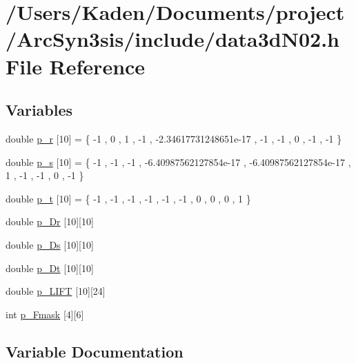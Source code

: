 \hypertarget{a00482}{}\section{/\+Users/\+Kaden/\+Documents/project/\+Arc\+Syn3sis/include/data3d\+N02.h File Reference}
\label{a00482}
\subsection*{Variables}
\begin{DoxyCompactItemize}
\item 
double \hyperlink{a00482_ad0e413c816dfa121d92ed67c43d35071}{p\+\_\+r} \mbox{[}10\mbox{]} = \{ -\/1 , 0 , 1 , -\/1 , -\/2.\+34617731248651e-\/17 , -\/1 , -\/1 , 0 , -\/1 , -\/1 \}
\item 
double \hyperlink{a00482_ab412f40aac46b2e78aceb916a6f1b16f}{p\+\_\+s} \mbox{[}10\mbox{]} = \{ -\/1 , -\/1 , -\/1 , -\/6.\+40987562127854e-\/17 , -\/6.\+40987562127854e-\/17 , 1 , -\/1 , -\/1 , 0 , -\/1 \}
\item 
double \hyperlink{a00482_a7b071b440a3000e20968bd1d42cf6984}{p\+\_\+t} \mbox{[}10\mbox{]} = \{ -\/1 , -\/1 , -\/1 , -\/1 , -\/1 , -\/1 , 0 , 0 , 0 , 1 \}
\item 
double \hyperlink{a00482_a77cc0f5d6b095d707a8f44917daa5848}{p\+\_\+\+Dr} \mbox{[}10\mbox{]}\mbox{[}10\mbox{]}
\item 
double \hyperlink{a00482_ada19a548901d8b04fd5c62d0e30d53f7}{p\+\_\+\+Ds} \mbox{[}10\mbox{]}\mbox{[}10\mbox{]}
\item 
double \hyperlink{a00482_a0bbb30de9136694ac606b109f3ee3fbe}{p\+\_\+\+Dt} \mbox{[}10\mbox{]}\mbox{[}10\mbox{]}
\item 
double \hyperlink{a00482_ae35710fabe458ad830273cab6823c259}{p\+\_\+\+L\+I\+FT} \mbox{[}10\mbox{]}\mbox{[}24\mbox{]}
\item 
int \hyperlink{a00482_a0c9aea0754df0fd04aa5c79c1a985dd5}{p\+\_\+\+Fmask} \mbox{[}4\mbox{]}\mbox{[}6\mbox{]}
\end{DoxyCompactItemize}


\subsection{Variable Documentation}
\mbox{\label{a00482_a77cc0f5d6b095d707a8f44917daa5848}} 
